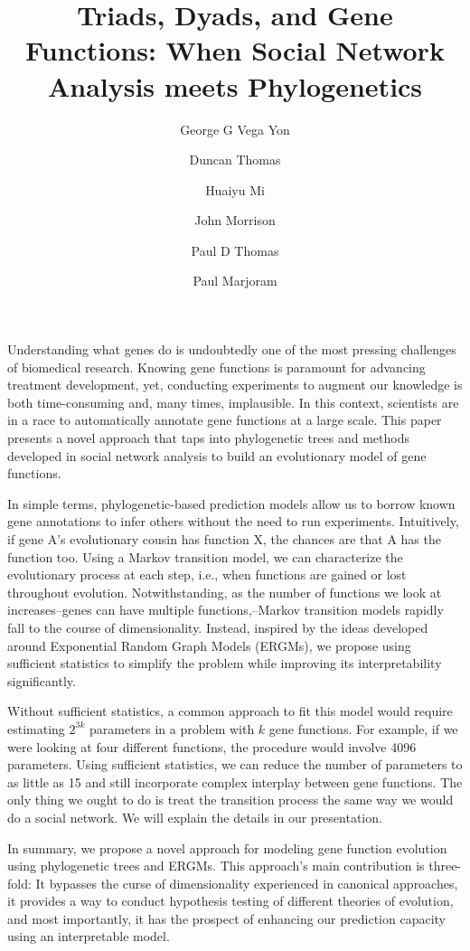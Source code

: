 \documentclass[11pt]{article}
\author{
	George G Vega Yon \and 
	Duncan Thomas \and
	Huaiyu Mi \and
	John Morrison \and
	Paul D Thomas \and
	Paul Marjoram
}
\title{Triads, Dyads, and Gene Functions: When Social Network Analysis meets Phylogenetics}
\date{}
\begin{document}
	
	\maketitle
	
Understanding what genes do is undoubtedly one of the most pressing challenges of biomedical research. Knowing gene functions is paramount for advancing treatment development, yet, conducting experiments to augment our knowledge is both time-consuming and, many times, implausible. In this context, scientists are in a race to automatically annotate gene functions at a large scale. This paper presents a novel approach that taps into phylogenetic trees and methods developed in social network analysis to build an evolutionary model of gene functions.


In simple terms, phylogenetic-based prediction models allow us to borrow known gene annotations to infer others without the need to run experiments. Intuitively, if gene A's evolutionary cousin has function X, the chances are that A has the function too. Using a Markov transition model, we can characterize the evolutionary process at each step, i.e., when functions are gained or lost throughout evolution. Notwithstanding, as the number of functions we look at increases--genes can have multiple functions,--Markov transition models rapidly fall to the course of dimensionality. Instead, inspired by the ideas developed around Exponential Random Graph Models (ERGMs), we propose using sufficient statistics to simplify the problem while improving its interpretability significantly.

Without sufficient statistics, a common approach to fit this model would require estimating $2^{3k}$ parameters in a problem with $k$ gene functions. For example, if we were looking at four different functions, the procedure would involve 4096 parameters. Using sufficient statistics, we can reduce the number of parameters to as little as 15 and still incorporate complex interplay between gene functions. The only thing we ought to do is treat the transition process the same way we would do a social network. We will explain the details in our presentation.

In summary, we propose a novel approach for modeling gene function evolution using phylogenetic trees and ERGMs. This approach's main contribution is three-fold: It bypasses the curse of dimensionality experienced in canonical approaches, it provides a way to conduct hypothesis testing of different theories of evolution, and most importantly, it has the prospect of enhancing our prediction capacity using an interpretable model.
\end{document}
